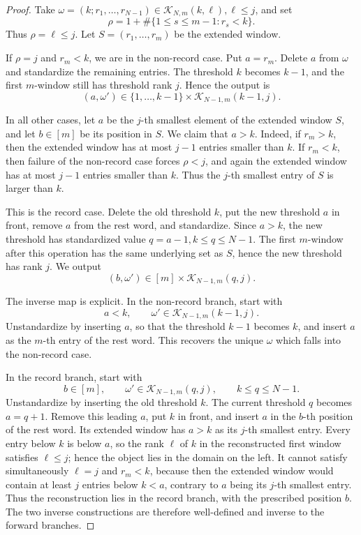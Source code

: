 \documentclass[10pt,a4paper]{amsart}
\begin{document}
\begin{proof}
Take $\omega=(k;r_1,\ldots,r_{N-1})\in\mathcal K_{N,m}(k,\ell), \ell\le j$, and set
\[
\rho=1+\#\{1\le s\le m-1:r_s<k\}.
\]
Thus \(\rho=\ell\le j\).  Let $S=(r_1,\ldots,r_m)$ be the extended window.

If $\rho=j$ and $r_m<k$, we are in the non-record case.  Put \(a=r_m\).  Delete \(a\) from \(\omega\)
and standardize the remaining entries.  The threshold \(k\) becomes \(k-1\),
and the first \(m\)-window still has threshold rank \(j\).  Hence the output is
\[
(a,\omega')\in
\{1,\ldots,k-1\}\times\mathcal K_{N-1,m}(k-1,j).
\]

In all other cases, let \(a\) be the \(j\)-th smallest element of the extended
window \(S\), and let \(b\in[m]\) be its position in \(S\).  We claim that
\(a>k\).  Indeed, if \(r_m>k\), then the extended window has at most \(j-1\)
entries smaller than \(k\).  If \(r_m<k\), then failure of the non-record case
forces \(\rho<j\), and again the extended window has at most \(j-1\) entries
smaller than \(k\).  Thus the \(j\)-th smallest entry of \(S\) is larger than
\(k\).

This is the record case.  Delete the old threshold \(k\), put the new threshold
\(a\) in front, remove \(a\) from the rest word, and standardize.  Since
\(a>k\), the new threshold has standardized value $q=a-1, k\le q\le N-1$. The first \(m\)-window after this operation has the same underlying set as
\(S\), hence the new threshold has rank \(j\).  We output
\[
(b,\omega')\in
[m]\times \mathcal K_{N-1,m}(q,j).
\]

The inverse map is explicit.  In the non-record branch, start with
\[
a<k,\qquad \omega'\in\mathcal K_{N-1,m}(k-1,j).
\]
Unstandardize by inserting \(a\), so that the threshold \(k-1\) becomes \(k\),
and insert \(a\) as the \(m\)-th entry of the rest word.  This recovers the
unique \(\omega\) which falls into the non-record case.

In the record branch, start with
\[
b\in[m],\qquad
\omega'\in\mathcal K_{N-1,m}(q,j),\qquad k\le q\le N-1.
\]
Unstandardize by inserting the old threshold \(k\).  The current threshold
\(q\) becomes \(a=q+1\).  Remove this leading \(a\), put \(k\) in front, and
insert \(a\) in the \(b\)-th position of the rest word.  Its extended window
has \(a>k\) as its \(j\)-th smallest entry.  Every entry below \(k\) is below
\(a\), so the rank \(\ell\) of \(k\) in the reconstructed first window
satisfies \(\ell\le j\); hence the object lies in the domain on the left.
It cannot satisfy simultaneously \(\ell=j\) and \(r_m<k\), because then the
extended window would contain at least \(j\) entries below \(k<a\), contrary
to \(a\) being its \(j\)-th smallest entry.  Thus the reconstruction lies in
the record branch, with the prescribed position \(b\).  The two inverse
constructions are therefore well-defined and inverse to the forward branches.
\end{proof}
\end{document}
